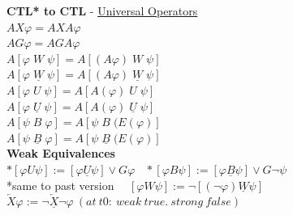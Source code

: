 \documentclass{article}
\begin{document}
\begin{multicols}{4}
\textbf{CTL* to CTL} - \underline{Universal Operators}\\
$AX\varphi = AXA \varphi$\\
$AG\varphi = AGA\varphi$\\
$A[\varphi\; W \; \psi]=A[(A\varphi)\; W \;\psi]$\\
$A[\varphi\; \underline{W} \; \psi]=A[(A\varphi)\; \underline{W} \;\psi]$\\
$A[\varphi\; U \; \psi]=A[A(\varphi) \; U \;\psi]$\\
$A[\varphi\; \underline{U} \; \psi]=A[A(\varphi) \; \underline{U} \;\psi]$\\
$A[\psi\; B \; \varphi]=A[\psi\; B \;(E(\varphi)]$\\
$A[\psi\; \underline{B} \; \varphi]=A[\psi\; \underline{B} \;(E(\varphi)]$\\

\textbf{Weak Equivalences} \\
$*[\varphi U \psi] := [\varphi \underline{U} \psi] \vee G\varphi \ \ \ \ *[\varphi B \psi] := [\varphi \underline{B} \psi] \vee G\neg\psi$ \\
*same to past version$\ \ \ \ \ \ [\varphi W \psi] := \neg[(\neg\varphi) \underline{W} \psi]$ \\
$\overleftarrow{X}\varphi := \neg\overleftarrow{\underline{X}}\neg\varphi\ (at\ t0:\ weak\ true.\ strong\ false) $ \\


\end{multicols}
\end{document}
